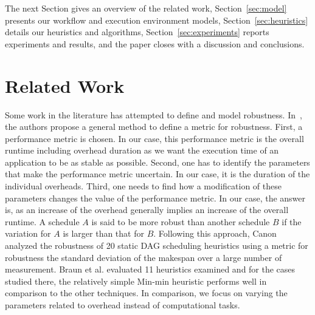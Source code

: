 The next Section gives an overview of the related work, Section~\ref{sec:model} presents our workflow and execution environment models, Section~\ref{sec:heuristics} details our heuristics and algorithms, Section~\ref{sec:experiments} reports experiments and results, and the paper closes with a discussion and conclusions.

\section{Related Work}
\label{related}


Some work in the literature has attempted to define and model robustness. In~\cite{Ali2004}, the authors propose a general method to define a metric for robustness. First, a performance metric is chosen. In our case, this performance metric is the overall runtime including overhead duration as we want the execution time of an application to be as stable as possible. Second, one has to identify the parameters that make the performance metric uncertain. In our case, it is the duration of the individual overheads. Third, one needs to find how a modification of these parameters changes the value of the performance metric. In our case, the answer is, as an increase of the overhead generally implies an increase of the overall runtime. 
A schedule $A$ is said to be more robust than another schedule $B$ if the variation for $A$ is larger than that for $B$.
Following this approach, Canon~\cite{Canon2008} analyzed the robustness of 20 static DAG scheduling heuristics using a metric for robustness the standard deviation of the makespan over a large number of measurement. Braun et al. \cite{Braun2001} evaluated 11 heuristics examined and for the cases studied there, the relatively simple Min-min heuristic performs well in comparison to the other techniques. In comparison, we focus on varying the parameters related to overhead instead of computational tasks. 

